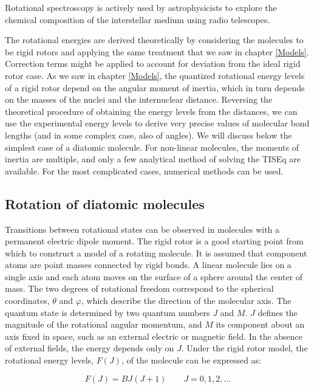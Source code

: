 \documentclass[
  9pt,
]{extbook}
\theoremstyle{definition}
\theoremstyle{definition}
\theoremstyle{definition}
\theoremstyle{remark}
\begin{document}
Rotational spectroscopy is actively used by astrophysicists to explore the chemical composition of the interstellar medium using radio telescopes.

The rotational energies are derived theoretically by considering the molecules to be rigid rotors and applying the same treatment that we saw in chapter \ref{Models}. Correction terms might be applied to account for deviation from the ideal rigid rotor case. As we saw in chapter \ref{Models}, the quantized rotational energy levels of a rigid rotor depend on the angular moment of inertia, which in turn depends on the masses of the nuclei and the internuclear distance. Reversing the theoretical procedure of obtaining the energy levels from the distances, we can use the experimental energy levels to derive very precise values of molecular bond lengths (and in some complex case, also of angles). We will discuss below the simplest case of a diatomic molecule. For non-linear molecules, the moments of inertia are multiple, and only a few analytical method of solving the TISEq are available. For the most complicated cases, numerical methods can be used.

\hypertarget{rotation-of-diatomic-molecules}{%
\subsection{Rotation of diatomic molecules}\label{rotation-of-diatomic-molecules}}

Transitions between rotational states can be observed in molecules with a permanent electric dipole moment. The rigid rotor is a good starting point from which to construct a model of a rotating molecule. It is assumed that component atoms are point masses connected by rigid bonds. A linear molecule lies on a single axis and each atom moves on the surface of a sphere around the center of mass. The two degrees of rotational freedom correspond to the spherical coordinates, \(\theta\) and \(\varphi\), which describe the direction of the molecular axis. The quantum state is determined by two quantum numbers \(J\) and \(M\). \(J\) defines the magnitude of the rotational angular momentum, and \(M\) its component about an axis fixed in space, such as an external electric or magnetic field. In the absence of external fields, the energy depends only on \(J\). Under the rigid rotor model, the rotational energy levels, \(F(J)\), of the molecule can be expressed as:

\begin{equation}
F\left(J\right)=BJ\left(J+1\right)\qquad J=0,1,2,\ldots
\label{eq:rot1}
\end{equation}
\end{document}
